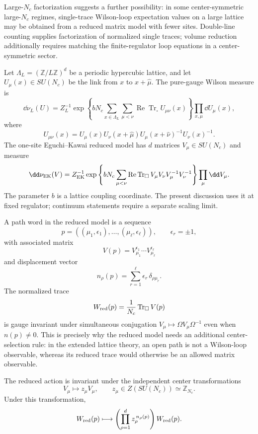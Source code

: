 Large-\(N_c\) factorization suggests a further possibility: in some
center-symmetric large-\(N_c\) regimes, single-trace Wilson-loop expectation
values on a large lattice may be obtained from a reduced matrix model with
fewer sites.  Double-line counting supplies factorization of normalized
single traces; volume reduction additionally requires matching the
finite-regulator loop equations in a center-symmetric sector.

Let \(\Lambda_L=(\mathbb Z/L\mathbb Z)^d\) be a periodic hypercubic lattice,
and let \(U_\mu(x)\in SU(N_c)\) be the link from \(x\) to
\(x+\hat\mu\).  The pure-gauge Wilson measure is
\[
  \dd\nu_L(U)
  =
  Z_L^{-1}
  \exp\left\{
    bN_c\sum_{x\in\Lambda_L}\sum_{\mu<\nu}
    \operatorname{Re}\operatorname{Tr}_{\square}
    U_{\mu\nu}(x)
  \right\}
  \prod_{x,\mu}\dd U_\mu(x),
\]
where
\[
  U_{\mu\nu}(x)=
  U_\mu(x)U_\nu(x+\hat\mu)
  U_\mu(x+\hat\nu)^{-1}U_\nu(x)^{-1}.
\]
The one-site Eguchi--Kawai reduced model has \(d\) matrices
\(V_\mu\in SU(N_c)\) and measure
\begin{equation}
  \dd\nu_{\rm EK}(V)
  =
  Z_{\rm EK}^{-1}
  \exp\left\{
    bN_c\sum_{\mu<\nu}
    \operatorname{Re}\operatorname{Tr}_{\square}
    V_\mu V_\nu V_\mu^{-1}V_\nu^{-1}
  \right\}
  \prod_\mu \dd V_\mu .
  \label{eq:qcd-eguchi-kawai-reduced-measure}
\end{equation}
The parameter \(b\) is a lattice coupling coordinate.  The present discussion
uses it at fixed regulator; continuum statements require a separate scaling
limit.

A path word in the reduced model is a sequence
\[
  p=((\mu_1,\epsilon_1),\ldots,(\mu_\ell,\epsilon_\ell)),
  \qquad \epsilon_r=\pm1 ,
\]
with associated matrix
\[
  V(p)=V_{\mu_1}^{\epsilon_1}\cdots V_{\mu_\ell}^{\epsilon_\ell}
\]
and displacement vector
\begin{equation}
  n_\rho(p)=
  \sum_{r=1}^{\ell}\epsilon_r\,\delta_{\rho\mu_r}.
  \label{eq:qcd-ek-word-displacement}
\end{equation}
The normalized trace
\[
  W_{\rm red}(p)=\frac1{N_c}\operatorname{Tr}_{\square}V(p)
\]
is gauge invariant under simultaneous conjugation
\(V_\mu\mapsto \Omega V_\mu\Omega^{-1}\) even when \(n(p)\ne0\).  This is
precisely why the reduced model needs an additional center-selection rule:
in the extended lattice theory, an open path is not a Wilson-loop observable,
whereas its reduced trace would otherwise be an allowed matrix observable.

The reduced action is invariant under the independent center transformations
\begin{equation}
  V_\mu\longmapsto z_\mu V_\mu,\qquad
  z_\mu\in Z(SU(N_c))\simeq\mathbb Z_{N_c}.
  \label{eq:qcd-ek-center-transformation}
\end{equation}
Under this transformation,
\begin{equation}
  W_{\rm red}(p)
  \longmapsto
  \left(\prod_{\rho=1}^{d}z_\rho^{\,n_\rho(p)}\right)
  W_{\rm red}(p).
  \label{eq:qcd-ek-open-word-center-charge}
\end{equation}

